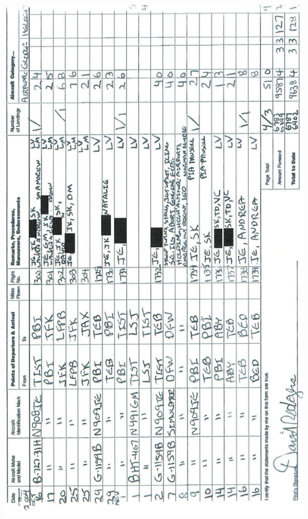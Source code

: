 \documentclass[10pt]{article}
\begin{document}
\includegraphics[max width=\textwidth, center]{2025_02_27_dd68c3d38de88f0516d9g-116}\\
\end{document}
